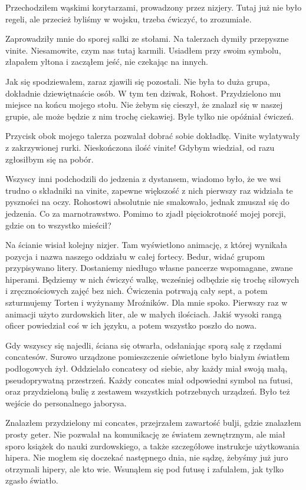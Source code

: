 Przechodziłem wąskimi korytarzami, prowadzony przez nizjery. 
Tutaj już nie było regeli, ale przecież byliśmy w wojsku, trzeba ćwiczyć, to zrozumiałe.

Zaprowadziły mnie do sporej salki ze stołami.
Na talerzach dymiły przepyszne vinite.
Niesamowite, czym nas tutaj karmili.
Usiadłem przy swoim symbolu, złapałem yltona i zacząłem jeść, nie czekając na innych.

Jak się spodziewałem, zaraz zjawili się pozostali.
Nie była to duża grupa, dokładnie dziewiętnaście osób.
W tym ten dziwak, Rohost.
Przydzielono mu miejsce na końcu mojego stołu.
Nie żebym się cieszył, że znalazł się w naszej grupie, ale może będzie z nim trochę ciekawiej.
Byle tylko nie opóźniał ćwiczeń.

Przycisk obok mojego talerza pozwalał dobrać sobie dokładkę.
Vinite wylatywały z zakrzywionej rurki.
Nieskończona ilość vinite! Gdybym wiedział, od razu zgłosiłbym się na pobór.

Wszyscy inni podchodzili do jedzenia z dystansem, wiadomo było, że we wsi trudno o składniki na vinite, zapewne większość z nich pierwszy raz widziała te pyszności na oczy.
Rohostowi absolutnie nie smakowało, jednak zmuszał się do jedzenia.
Co za marnotrawstwo.
Pomimo to zjadł pięciokrotność mojej porcji, gdzie on to wszystko mieścił?

Na ścianie wisiał kolejny nizjer.
Tam wyświetlono animację, z której wynikała pozycja i nazwa naszego oddziału w całej fortecy. Bedur, widać grupom przypisywano litery.
Dostaniemy niedługo własne pancerze wspomagane, zwane hiperami.
Będziemy w nich ćwiczyć walkę, wcześniej odbędzie się trochę siłowych i zręcznościowych zajęć bez nich.
Ćwiczenia potrwają cały sept, a potem szturmujemy Torten i wyżynamy Mroźników.
Dla mnie spoko.
Pierwszy raz w animacji użyto zurdowskich liter, ale w małych ilościach.
Jakiś wysoki rangą oficer powiedział coś w ich języku, a potem wszystko poszło do nowa.

Gdy wszyscy się najedli, ściana się otwarła, odsłaniając sporą salę z rzędami concatesów.
Surowo urządzone pomieszczenie oświetlone było białym światłem podłogowych żył.
Oddzielało concatesy od siebie, aby każdy miał swoją małą, pseudoprywatną przestrzeń.
Każdy concates miał odpowiedni symbol na futusi, oraz przydzieloną bulię z zestawem wszystkich potrzebnych urządzeń.
Było też wejście do personalnego jaborysa.

Znalazłem przydzielony mi concates, przejrzałem zawartość bulji, gdzie znalazłem prosty geter.
Nie pozwalał na komunikację ze światem zewnętrznym, ale miał sporo książek do nauki zurdowskiego, a także szczegółowe instrukcje użytkowania hipera.
Nie mogłem się doczekać następnego dnia, nie sądzę, żebyśmy już juro otrzymali hipery, ale kto wie.
Wsunąłem się pod futusę i zafulałem, jak tylko zgasło światło.

